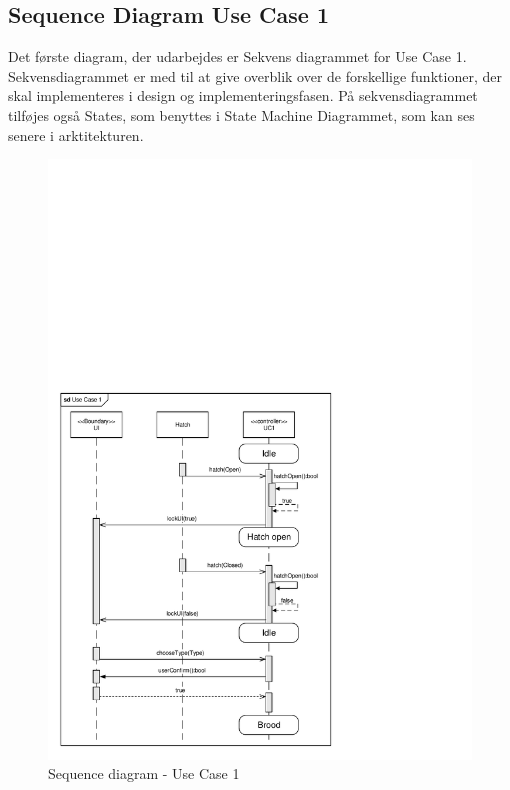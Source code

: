 
\subsection{Sequence Diagram Use Case 1}

Det første diagram, der udarbejdes er Sekvens diagrammet for Use Case 1.
Sekvensdiagrammet er med til at give overblik over de forskellige funktioner, der skal implementeres i design og implementeringsfasen.
På sekvensdiagrammet tilføjes også States, som benyttes i State Machine Diagrammet, som kan ses senere i arktitekturen. 

\begin{figure}[H]
\centering
\includegraphics[page=1,width=\linewidth,viewport=07mm 08mm 139mm 180mm]{./2_systemarkitektur/diagrammer/ArkitekturDiagrammer.pdf}
\caption[Diagram]{Sequence diagram - Use Case 1}
\label{fig:SystemStateDiagram}
\end{figure}

\clearpage